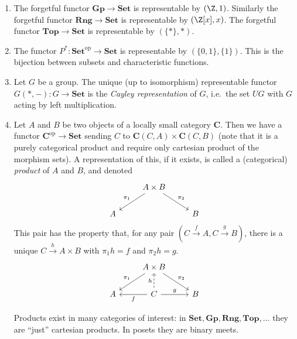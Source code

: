 \documentclass[a4paper]{article}
\renewcommand{\c}[1]{\mathbf{#1}}
\newcommand{\Set}{{\c{Set}}}
\newcommand{\Top}{{\c{Top}}}
\begin{document}
\begin{eg}\leavevmode
  \begin{enumerate}
  \item The forgetful functor \(\c{Gp} \to \Set\) is representable by \((\Z, 1)\). Similarly the forgetful functor \(\c{Rng} \to \Set\) is representable by \((\Z[x], x)\). The forgetful functor \(\Top \to \Set\) is representable by \((\{*\}, *)\).
  \item The functor \(P^*: \Set^{\text{op}} \to \Set\) is representable by \((\{0, 1\}, \{1\})\). This is the bijection between subsets and characteristic functions.
  \item Let \(G\) be a group. The unique (up to isomorphism) representable functor \(G(*, -): G \to \Set\) is the \emph{Cayley representation} of \(G\), i.e.\ the set \(UG\) with \(G\) acting by left multiplication.
  \item Let \(A\) and \(B\) be two objects of a locally small category \(\c C\). Then we have a functor \(\c C^{\text{op}} \to \Set\) sending \(C\) to \(\c C(C, A) \times \c C(C, B)\) (note that it is a purely categorical product and require only cartesian product of the morphism sets). A representation of this, if it exists, is called a (categorical) \emph{product} of \(A\) and \(B\), and denoted
    \[
      \begin{tikzcd}
        & A \times B \ar[dl, "\pi_1"'] \ar[dr, "\pi_2"] \\
        A & & B
      \end{tikzcd}
    \]
    This pair has the property that, for any pair \((C \xrightarrow{f} A, C \xrightarrow{g} B)\), there is a unique \(C \xrightarrow{h} A \times B\) with \(\pi_1 h = f\) and \(\pi_2 h = g\).
    \[
      \begin{tikzcd}
        & A \times B \ar[dl, "\pi_1"'] \ar[dr, "\pi_2"] \\
        A & C \ar[l, "f"] \ar[r, "g"] \ar[u, "h", dashed] & B
      \end{tikzcd}
    \]
 
    Products exist in many categories of interest: in \(\Set, \c{Gp}, \c{Rng}, \Top, \dots\) they are ``just'' cartesian products. In posets they are binary meets.


\end{enumerate}
\end{eg}
\end{document}
